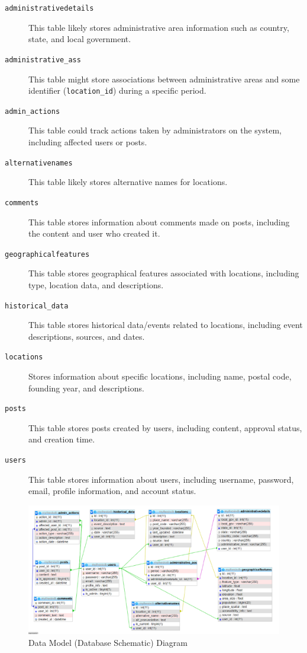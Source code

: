 \begin{description}

    \item[\texttt{administrativedetails}] This table likely stores administrative area information such as country, state, and local government.

    \item[\texttt{administrative\_ass}] This table might store associations between administrative areas and some identifier (\texttt{location\_id}) during a specific period.

    \item[\texttt{admin\_actions}] This table could track actions taken by administrators on the system, including affected users or posts.

    \item[\texttt{alternativenames}] This table likely stores alternative names for locations.

    \item[\texttt{comments}] This table stores information about comments made on posts, including the content and user who created it.

    \item[\texttt{geographicalfeatures}] This table stores geographical features associated with locations, including type, location data, and descriptions.

    \item[\texttt{historical\_data}] This table stores historical data/events related to locations, including event descriptions, sources, and dates.

    \item[\texttt{locations}] Stores information about specific locations, including name, postal code, founding year, and descriptions.

    \item[\texttt{posts}] This table stores posts created by users, including content, approval status, and creation time.

    \item[\texttt{users}] This table stores information about users, including username, password, email, profile information, and account status.

\end{description}

\newpage

\begin{figure}
    \centering
    \includegraphics[width=1\linewidth]{model_schema.png}
    \caption{Data Model (Database Schematic) Diagram}
    \label{fig:enter-label}
\end{figure}
\newpage
